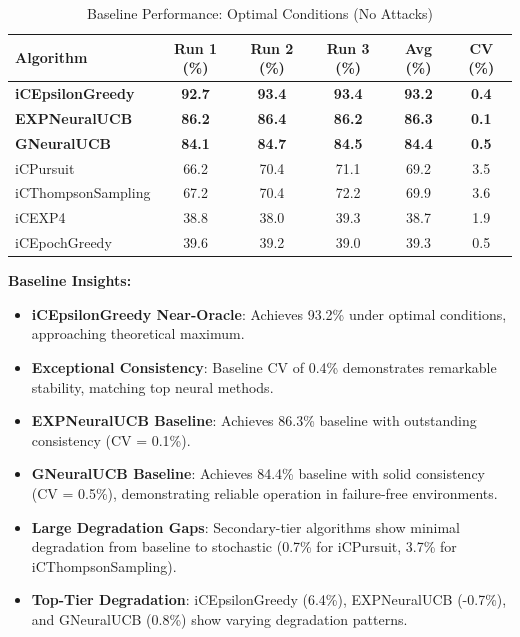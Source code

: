 \documentclass[12pt,a4paper]{article}
\newcommand{\primarytext}[1]{\textcolor{primaryblue}{\textbf{#1}}}
\newcommand{\secondarytext}[1]{\textcolor{secondaryblue}{\textbf{#1}}}
\newcommand{\warning}[1]{\textcolor{warningred}{\textbf{#1}}}
\newcommand{\legacy}[1]{\textcolor{legacycolor}{\textbf{#1}}}
\newcommand{\neural}[1]{\textcolor{neuralcolor}{\textbf{#1}}}
\begin{document}
\begin{table}[H]
\centering
\caption{Baseline Performance: Optimal Conditions (No Attacks)}
\label{tab:baseline-performance}
\begin{tabular}{@{}lccccc@{}}
\toprule
\textbf{Algorithm} & \textbf{Run 1 (\%)} & \textbf{Run 2 (\%)} & \textbf{Run 3 (\%)} & \textbf{Avg (\%)} & \textbf{CV (\%)} \\
\midrule
\primarytext{iCEpsilonGreedy}   & \primarytext{92.7} & \primarytext{93.4} & \primarytext{93.4} & \primarytext{93.2} & \primarytext{0.4} \\
\legacy{EXPNeuralUCB}           & \legacy{86.2} & \legacy{86.4} & \legacy{86.2} & \legacy{86.3} & \legacy{0.1} \\
\neural{GNeuralUCB}            & \neural{84.1} & \neural{84.7} & \neural{84.5} & \neural{84.4} & \neural{0.5} \\
iCPursuit                       & 66.2 & 70.4 & 71.1 & 69.2 & 3.5 \\
iCThompsonSampling              & 67.2 & 70.4 & 72.2 & 69.9 & 3.6 \\
iCEXP4                          & 38.8 & 38.0 & 39.3 & 38.7 & 1.9 \\
iCEpochGreedy                   & 39.6 & 39.2 & 39.0 & 39.3 & 0.5 \\
\bottomrule
\end{tabular}
\end{table}

\textbf{Baseline Insights:}
\begin{itemize}
\item \primarytext{iCEpsilonGreedy Near-Oracle}: Achieves 93.2\% under optimal conditions, approaching theoretical maximum.
\item \primarytext{Exceptional Consistency}: Baseline CV of 0.4\% demonstrates remarkable stability, matching top neural methods.
\item \legacy{EXPNeuralUCB Baseline}: Achieves 86.3\% baseline with outstanding consistency (CV = 0.1\%).
\item \neural{GNeuralUCB Baseline}: Achieves 84.4\% baseline with solid consistency (CV = 0.5\%), demonstrating reliable operation in failure-free environments.
\item \secondarytext{Large Degradation Gaps}: Secondary-tier algorithms show minimal degradation from baseline to stochastic (0.7\% for iCPursuit, 3.7\% for iCThompsonSampling).
\item \warning{Top-Tier Degradation}: iCEpsilonGreedy (6.4\%), EXPNeuralUCB (-0.7\%), and GNeuralUCB (0.8\%) show varying degradation patterns.
\end{itemize}
\end{document}

